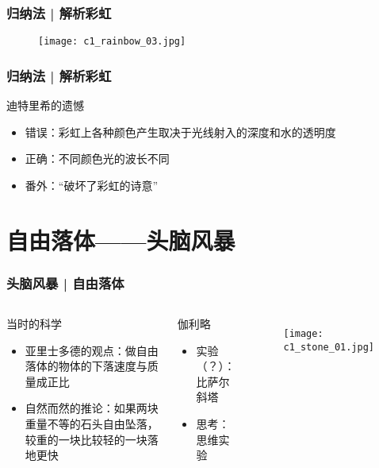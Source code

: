 \begin{frame}
  \frametitle{归纳法 | 解析彩虹}
  \begin{figure}
    \centering
    \texttt{[image: c1\_rainbow\_03.jpg]}
  \end{figure}
\end{frame}

\begin{frame}
  \frametitle{归纳法 | 解析彩虹}
  \begin{block}{迪特里希的遗憾}
    \begin{itemize}
      \item 错误：彩虹上各种颜色产生取决于光线射入的深度和水的透明度
      \item 正确：不同颜色光的波长不同
      \item 番外：“破坏了彩虹的诗意”
    \end{itemize}
  \end{block}
\end{frame}

\section{自由落体——头脑风暴}
\begin{frame}
  \frametitle{头脑风暴 | 自由落体}
  \begin{columns}
  \begin{block}{当时的科学}
    \begin{itemize}
      \item 亚里士多德的观点：做自由落体的物体的下落速度与质量成正比 
      \item 自然而然的推论：如果两块重量不等的石头自由坠落，较重的一块比较轻的一块落地更快
    \end{itemize}
  \end{block}
  \begin{block}{伽利略}
    \begin{itemize}
      \item 实验（？）：比萨尔斜塔
      \item 思考：思维实验
    \end{itemize}
  \end{block}
    \begin{figure}
      \centering
      \texttt{[image: c1\_stone\_01.jpg]}
    \end{figure}
  \end{columns}
\end{frame}

